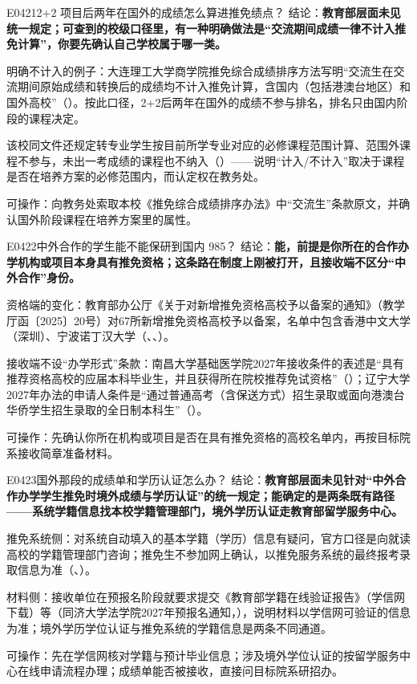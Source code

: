 \begin{qa}{E0421}{2+2 项目后两年在国外的成绩怎么算进推免绩点？}
结论：\textbf{教育部层面未见统一规定；可查到的校级口径里，有一种明确做法是“交流期间成绩一律不计入推免计算”，你要先确认自己学校属于哪一类。}

明确不计入的例子：大连理工大学商学院推免综合成绩排序方法写明“交流生在交流期间原始成绩和转换后的成绩均不计入推免计算，含国内（包括港澳台地区）和国外高校”（）。按此口径，2+2后两年在国外的成绩不参与排名，排名只由国内阶段的课程决定。

该校同文件还规定转专业学生按目前所学专业对应的必修课程范围计算、范围外课程不参与，未出一考成绩的课程也不纳入（）——说明“计入/不计入”取决于课程是否在培养方案的必修范围内，而认定权在教务处。

可操作：向教务处索取本校《推免综合成绩排序办法》中“交流生”条款原文，并确认国外阶段课程在培养方案里的属性。
\end{qa}

\begin{qa}{E0422}{中外合作的学生能不能保研到国内 985？}
结论：\textbf{能，前提是你所在的合作办学机构或项目本身具有推免资格；这条路在制度上刚被打开，且接收端不区分“中外合作”身份。}

资格端的变化：教育部办公厅《关于对新增推免资格高校予以备案的通知》（教学厅函〔2025〕20号）对67所新增推免资格高校予以备案，名单中包含香港中文大学（深圳）、宁波诺丁汉大学（、、）。

接收端不设“办学形式”条款：南昌大学基础医学院2027年接收条件的表述是“具有推荐资格高校的应届本科毕业生，并且获得所在院校推荐免试资格”（）；辽宁大学2027年办法的申请人条件是“通过普通高考（含保送方式）招生录取或面向港澳台华侨学生招生录取的全日制本科生”（）。

可操作：先确认你所在机构或项目是否在具有推免资格的高校名单内，再按目标院系接收简章准备材料。
\end{qa}

\begin{qa}{E0423}{国外那段的成绩单和学历认证怎么办？}
结论：\textbf{教育部层面未见针对“中外合作办学学生推免时境外成绩与学历认证”的统一规定；能确定的是两条既有路径——系统学籍信息找本校学籍管理部门，境外学历认证走教育部留学服务中心。}

推免系统侧：对系统自动填入的基本学籍（学历）信息有疑问，官方口径是向就读高校的学籍管理部门咨询；推免生不参加网上确认，以推免服务系统的最终报考录取信息为准（、）。

材料侧：接收单位在预报名阶段就要求提交《教育部学籍在线验证报告》（学信网下载）等（同济大学法学院2027年预报名通知，），说明材料以学信网可验证的信息为准；境外学历学位认证与推免系统的学籍信息是两条不同通道。

可操作：先在学信网核对学籍与预计毕业信息；涉及境外学位认证的按留学服务中心在线申请流程办理；成绩单能否被接收，直接问目标院系研招办。
\end{qa}

